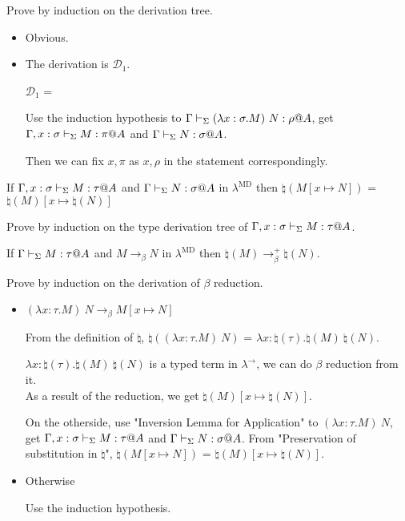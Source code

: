 Prove by induction on the derivation tree.

\begin{itemize}
	\item \TApp

	      Obvious.

	\item \TConv

	      The derivation is $\mathcal{D}_1$.

	      $\mathcal{D}_1$ = 
	      { \andalso {}}

	      Use the induction hypothesis to $\G \V (\lambda x:\sigma.M)\ N: \rho@A$, get $\Gamma, x:\sigma \vdash_\Sigma M : \pi @A$ and $\Gamma \vdash_\Sigma N:\sigma @ A$.

	      Then we can fix $x, \pi$ as $x, \rho$ in the statement correspondingly.

\end{itemize}

\begin{lemma}
	If $\G, x:\sigma \V M:\tau@A$ and $\G \V N:\sigma@A$ in $\lambda^{\text{MD}}$
	then $\natural(M[x \mapsto N])$ = $\natural(M)[x\mapsto\natural(N)]$
\end{lemma}

Prove by induction on the type derivation tree of $\G, x:\sigma \V M:\tau@A$.

\begin{lemma}
	If $\G \V M:\tau@A$ and $M \longrightarrow_\beta N$ in $\lambda^{\text{MD}}$
	then $\natural(M) \longrightarrow_\beta^+ \natural(N)$.
\end{lemma}

Prove by induction on the derivation of $\beta$ reduction.

\begin{itemize}
	\newcommand{\R}{\longrightarrow_{\beta}}
	\item $(\lambda x:\tau.M)\ N \R M[x \mapsto N]$

	      From the definition of $\natural$, $\natural((\lambda x:\tau.M)\ N)$ = $\lambda x:\natural(\tau).\natural(M)\ \natural(N)$.

	      $\lambda x:\natural(\tau).\natural(M)\ \natural(N)$ is a typed term in $\lambda^\to$, we can do $\beta$ reduction from it.\\
	      As a result of the reduction, we get $\natural(M)[x\mapsto\natural(N)]$.

	      On the otherside, use "Inversion Lemma for Application" to $(\lambda x:\tau.M)\ N$, get $\G, x:\sigma \V M:\tau@A$ and $\G \V N:\sigma@A$.
	      From "Preservation of substitution in $\natural$", $\natural(M[x \mapsto N])$ = $\natural(M)[x\mapsto\natural(N)]$.

	\item Otherwise

	      Use the induction hypothesis.
\end{itemize}

